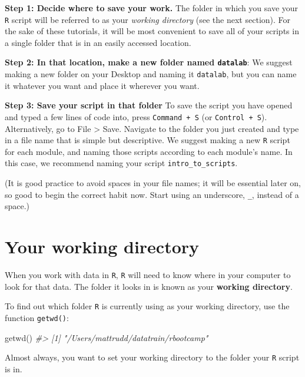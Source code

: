 \documentclass[
]{book}
\newenvironment{Shaded}{\begin{snugshade}}{\end{snugshade}}
\newcommand{\CommentTok}[1]{\textcolor[rgb]{0.56,0.35,0.01}{\textit{#1}}}
\newcommand{\FunctionTok}[1]{\textcolor[rgb]{0.00,0.00,0.00}{#1}}
\newcommand{\NormalTok}[1]{#1}
\begin{document}
\textbf{Step 1: Decide where to save your work.} The folder in which you save your \texttt{R} script will be referred to as your \emph{working directory} (see the next section). For the sake of these tutorials, it will be most convenient to save all of your scripts in a single folder that is in an easily accessed location.

\textbf{Step 2: In that location, make a new folder named \texttt{datalab}}: We suggest making a new folder on your Desktop and naming it \texttt{datalab}, but you can name it whatever you want and place it wherever you want.

\textbf{Step 3: Save your script in that folder} To save the script you have opened and typed a few lines of code into, press \texttt{Command\ +\ S} (or \texttt{Control\ +\ S}). Alternatively, go to File \textgreater{} Save. Navigate to the folder you just created and type in a file name that is simple but descriptive. We suggest making a new \texttt{R} script for each module, and naming those scripts according to each module's name. In this case, we recommend naming your script \texttt{intro\_to\_scripts}.

(It is good practice to avoid spaces in your file names; it will be essential later on, so good to begin the correct habit now. Start using an underscore, \texttt{\_}, instead of a space.)

\hypertarget{wd}{%
\section*{Your working directory}\label{wd}}

When you work with data in \texttt{R}, \texttt{R} will need to know where in your computer to look for that data. The folder it looks in is known as your \textbf{working directory}.

To find out which folder \texttt{R} is currently using as your working directory, use the function \texttt{getwd()}:

\begin{Shaded}
\begin{Highlighting}[]
\FunctionTok{getwd}\NormalTok{()}
\CommentTok{\#\textgreater{} [1] "/Users/mattrudd/datatrain/rbootcamp"}
\end{Highlighting}
\end{Shaded}

Almost always, you want to set your working directory to the folder your \texttt{R} script is in.
\end{document}
